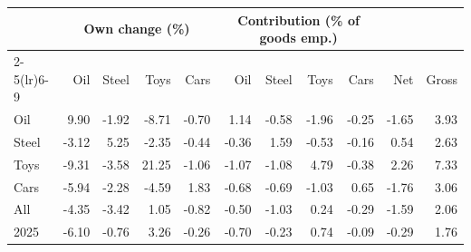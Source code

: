 \begin{tabular}{lrrrrrrrrrr}
\toprule
 & \multicolumn{4}{c}{Own change (\%)} & \multicolumn{4}{c}{Contribution (\% of goods emp.)} & & \\
\cmidrule(lr){2-5}\cmidrule(lr){6-9}
 & Oil & Steel & Toys & Cars & Oil & Steel & Toys & Cars & Net & Gross \\
\midrule
Oil & 9.90 & -1.92 & -8.71 & -0.70 & 1.14 & -0.58 & -1.96 & -0.25 & -1.65 & 3.93 \\
Steel & -3.12 & 5.25 & -2.35 & -0.44 & -0.36 & 1.59 & -0.53 & -0.16 & 0.54 & 2.63 \\
Toys & -9.31 & -3.58 & 21.25 & -1.06 & -1.07 & -1.08 & 4.79 & -0.38 & 2.26 & 7.33 \\
Cars & -5.94 & -2.28 & -4.59 & 1.83 & -0.68 & -0.69 & -1.03 & 0.65 & -1.76 & 3.06 \\
All & -4.35 & -3.42 & 1.05 & -0.82 & -0.50 & -1.03 & 0.24 & -0.29 & -1.59 & 2.06 \\
2025 & -6.10 & -0.76 & 3.26 & -0.26 & -0.70 & -0.23 & 0.74 & -0.09 & -0.29 & 1.76 \\
\bottomrule
\end{tabular}
